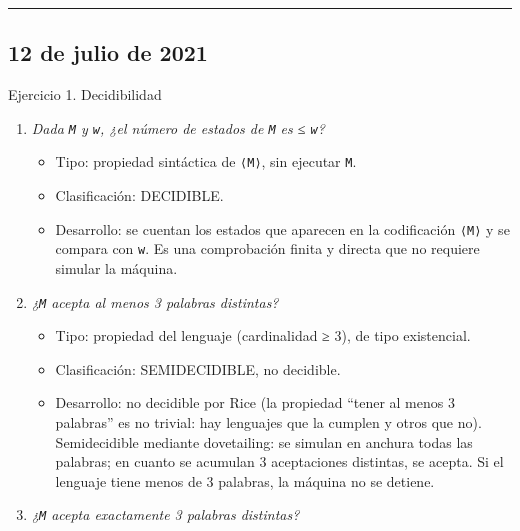 \documentclass[12pt]{book} %
\providecommand{\tightlist}{%
  \setlength{\itemsep}{0pt}\setlength{\parskip}{0pt}}
\begin{document}
\begin{center}\rule{0.5\linewidth}{0.5pt}\end{center}

\hypertarget{de-julio-de-2021}{%
\subsection{12 de julio de 2021}\label{de-julio-de-2021}}

Ejercicio 1. Decidibilidad

\begin{enumerate}
\def\labelenumi{\arabic{enumi}.}
\tightlist
\item
  \emph{Dada \texttt{M} y \texttt{w}, ¿el número de estados de
  \texttt{M} es ≤ \texttt{\textbar{}w\textbar{}}?}

  \begin{itemize}
  \tightlist
  \item
    Tipo: propiedad sintáctica de \texttt{⟨M⟩}, sin ejecutar \texttt{M}.
  \item
    Clasificación: DECIDIBLE.
  \item
    Desarrollo: se cuentan los estados que aparecen en la codificación
    \texttt{⟨M⟩} y se compara con \texttt{\textbar{}w\textbar{}}. Es una
    comprobación finita y directa que no requiere simular la máquina.
  \end{itemize}
\item
  \emph{¿\texttt{M} acepta al menos 3 palabras distintas?}

  \begin{itemize}
  \tightlist
  \item
    Tipo: propiedad del lenguaje (cardinalidad ≥ 3), de tipo
    existencial.
  \item
    Clasificación: SEMIDECIDIBLE, no decidible.
  \item
    Desarrollo: no decidible por Rice (la propiedad ``tener al menos 3
    palabras'' es no trivial: hay lenguajes que la cumplen y otros que
    no). Semidecidible mediante dovetailing: se simulan en anchura todas
    las palabras; en cuanto se acumulan 3 aceptaciones distintas, se
    acepta. Si el lenguaje tiene menos de 3 palabras, la máquina no se
    detiene.
  \end{itemize}
\item
  \emph{¿\texttt{M} acepta exactamente 3 palabras distintas?}


\end{enumerate}
\end{document}
